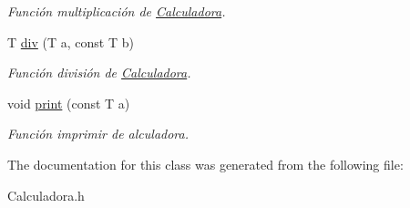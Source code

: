 \begin{DoxyCompactItemize}
\begin{DoxyCompactList}\small\item\em Función multiplicación de \hyperlink{class_calculadora}{Calculadora}. \end{DoxyCompactList}\item 
\hypertarget{class_calculadora_a38b613e1d241ec59744420fb49267920}{T \hyperlink{class_calculadora_a38b613e1d241ec59744420fb49267920}{div} (T a, const T b)}\label{class_calculadora_a38b613e1d241ec59744420fb49267920}

\begin{DoxyCompactList}\small\item\em Función división de \hyperlink{class_calculadora}{Calculadora}. \end{DoxyCompactList}\item 
\hypertarget{class_calculadora_a6cb0a45ce2942e41fe802183b918fe87}{void \hyperlink{class_calculadora_a6cb0a45ce2942e41fe802183b918fe87}{print} (const T a)}\label{class_calculadora_a6cb0a45ce2942e41fe802183b918fe87}

\begin{DoxyCompactList}\small\item\em Función imprimir de alculadora. \end{DoxyCompactList}\end{DoxyCompactItemize}


The documentation for this class was generated from the following file\+:\begin{DoxyCompactItemize}
\item 
Calculadora.\+h\end{DoxyCompactItemize}
